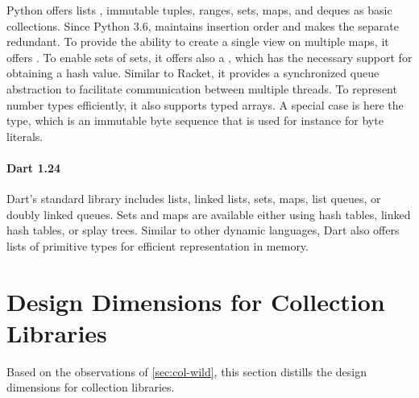 \documentclass[sigconf, 10pt]{acmart}
\begin{document}
Python offers lists , immutable tuples, ranges, sets, maps, and deques
as basic collections.
Since Python 3.6,  maintains insertion order and
makes the separate  redundant.
To provide the ability to create a single view on multiple maps,
it offers .
To enable sets of sets, it offers also a ,
which has the necessary support for obtaining a hash value.
Similar to Racket,
it provides a synchronized queue abstraction
to facilitate communication between multiple threads.
To represent number types efficiently, it also supports typed arrays.
A special case is here the  type,
which is an immutable byte sequence that is used for instance for byte literals.

\paragraph{Dart 1.24}

Dart's standard library includes lists, linked lists, sets, maps, list queues,
or doubly linked queues.
Sets and maps are available either using hash tables,
linked hash tables, or splay trees.
Similar to other dynamic languages,
Dart also offers lists of primitive types
for efficient representation in memory.



\section{Design Dimensions for Collection Libraries}

Based on the observations of \cref{sec:col-wild},
this section distills the design dimensions for collection libraries. 
\end{document}
